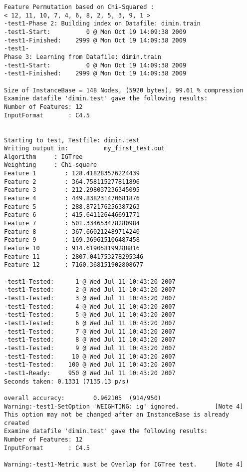 \documentclass{report}
\begin{document}
\begin{footnotesize}
\begin{verbatim}
Feature Permutation based on Chi-Squared :
< 12, 11, 10, 7, 4, 6, 8, 2, 5, 3, 9, 1 >
-test1-Phase 2: Building index on Datafile: dimin.train
-test1-Start:          0 @ Mon Oct 19 14:09:38 2009
-test1-Finished:    2999 @ Mon Oct 19 14:09:38 2009
-test1-
Phase 3: Learning from Datafile: dimin.train
-test1-Start:          0 @ Mon Oct 19 14:09:38 2009
-test1-Finished:    2999 @ Mon Oct 19 14:09:38 2009

Size of InstanceBase = 148 Nodes, (5920 bytes), 99.61 % compression
Examine datafile 'dimin.test' gave the following results:
Number of Features: 12
InputFormat       : C4.5


Starting to test, Testfile: dimin.test
Writing output in:          my_first_test.out
Algorithm     : IGTree
Weighting     : Chi-square
Feature 1        : 128.418283576224439
Feature 2        : 364.758115277811896
Feature 3        : 212.298037236345095
Feature 4        : 449.838231470681876
Feature 5        : 288.872176256387263
Feature 6        : 415.641126446691771
Feature 7        : 501.334653478280984
Feature 8        : 367.660212489714240
Feature 9        : 169.369615106487458
Feature 10       : 914.619058199288816
Feature 11       : 2807.041753278295346
Feature 12       : 7160.368151902808677

-test1-Tested:      1 @ Wed Jul 11 10:43:20 2007
-test1-Tested:      2 @ Wed Jul 11 10:43:20 2007
-test1-Tested:      3 @ Wed Jul 11 10:43:20 2007
-test1-Tested:      4 @ Wed Jul 11 10:43:20 2007
-test1-Tested:      5 @ Wed Jul 11 10:43:20 2007
-test1-Tested:      6 @ Wed Jul 11 10:43:20 2007
-test1-Tested:      7 @ Wed Jul 11 10:43:20 2007
-test1-Tested:      8 @ Wed Jul 11 10:43:20 2007
-test1-Tested:      9 @ Wed Jul 11 10:43:20 2007
-test1-Tested:     10 @ Wed Jul 11 10:43:20 2007
-test1-Tested:    100 @ Wed Jul 11 10:43:20 2007
-test1-Ready:     950 @ Wed Jul 11 10:43:20 2007
Seconds taken: 0.1331 (7135.13 p/s)

overall accuracy:        0.962105  (914/950)
Warning:-test1-SetOption 'WEIGHTING: ig' ignored.          [Note 4]
This option may not be changed after an InstanceBase is already created
Examine datafile 'dimin.test' gave the following results:
Number of Features: 12
InputFormat       : C4.5

Warning:-test1-Metric must be Overlap for IGTree test.     [Note 4]

\end{verbatim}
\end{footnotesize}
\end{document}
